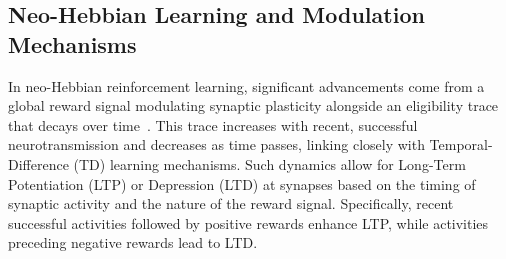 


\subsection*{Neo-Hebbian Learning and Modulation Mechanisms}

In neo-Hebbian reinforcement learning, significant advancements come from a global reward signal modulating synaptic plasticity alongside an eligibility trace that decays over time~\cite{Ch_1_R21}. This trace increases with recent, successful neurotransmission and decreases as time passes, linking closely with Temporal-Difference (TD) learning mechanisms. Such dynamics allow for Long-Term Potentiation (LTP) or Depression (LTD) at synapses based on the timing of synaptic activity and the nature of the reward signal. Specifically, recent successful activities followed by positive rewards enhance LTP, while activities preceding negative rewards lead to LTD.



